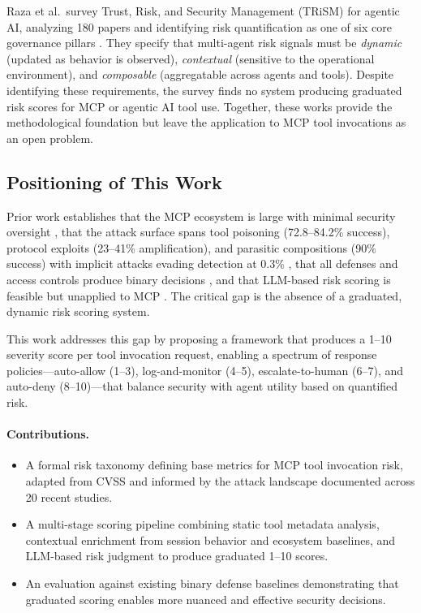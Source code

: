 \documentclass[12pt]{article}
\begin{document}
Raza et al.\ survey Trust, Risk, and Security Management (TRiSM) for agentic AI, analyzing 180 papers and identifying risk quantification as one of six core governance pillars \cite{raza2025trism}. They specify that multi-agent risk signals must be \emph{dynamic} (updated as behavior is observed), \emph{contextual} (sensitive to the operational environment), and \emph{composable} (aggregatable across agents and tools). Despite identifying these requirements, the survey finds no system producing graduated risk scores for MCP or agentic AI tool use. Together, these works provide the methodological foundation but leave the application to MCP tool invocations as an open problem.

\subsection{Positioning of This Work}

Prior work establishes that the MCP ecosystem is large with minimal security oversight \cite{hou2025mcp_landscape,li2025understanding_mcp}, that the attack surface spans tool poisoning (72.8--84.2\% success), protocol exploits (23--41\% amplification), and parasitic compositions (90\% success) with implicit attacks evading detection at 0.3\% \cite{ferrag2025prompt_to_protocol,wang2025mcptox,li2026mcp_itp,zhao2025mind_your_server,hu2026log_to_leak}, that all defenses and access controls produce binary decisions \cite{zhou2026mcpshield,xing2026mcp_guard,shi2025progent,buhler2025agentbound,mou2026toolsafe,xiang2025guardagent}, and that LLM-based risk scoring is feasible but unapplied to MCP \cite{jafarikhah2026description_to_score,raza2025trism}. The critical gap is the absence of a graduated, dynamic risk scoring system.

This work addresses this gap by proposing a framework that produces a 1--10 severity score per tool invocation request, enabling a spectrum of response policies---auto-allow (1--3), log-and-monitor (4--5), escalate-to-human (6--7), and auto-deny (8--10)---that balance security with agent utility based on quantified risk.

\paragraph{Contributions.}
\begin{itemize}
    \item A formal risk taxonomy defining base metrics for MCP tool invocation risk, adapted from CVSS and informed by the attack landscape documented across 20 recent studies.
    \item A multi-stage scoring pipeline combining static tool metadata analysis, contextual enrichment from session behavior and ecosystem baselines, and LLM-based risk judgment to produce graduated 1--10 scores.
    \item An evaluation against existing binary defense baselines demonstrating that graduated scoring enables more nuanced and effective security decisions.
\end{itemize}
\end{document}
